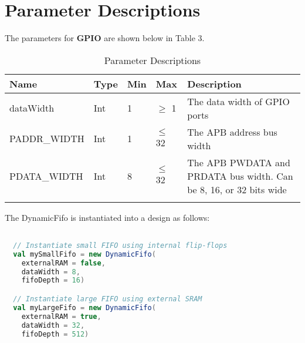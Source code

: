 
\section{Parameter Descriptions}

The parameters for \textbf{GPIO} are shown below in
Table 3.

\renewcommand*{\arraystretch}{1.4}
\begin{longtable}[H]{
    | p{}
    | p{}
    | p{}
    | p{}
    | p{} |
  }
  \hline
  \textbf{Name} &
  \textbf{Type} &
  \textbf{Min}  &
  \textbf{Max}  &
  \textbf{Description}            \\ \hline \hline

  dataWidth   &
  Int       &
  1         &
  $\geq$ 1          &
  The data width of GPIO ports \\ \hline

  PADDR\_WIDTH     &
  Int           &
  1             &
  $\leq$ 32       &
  The APB address bus width  \\ \hline

  PDATA\_WIDTH     &
  Int           &
  8             &
  $\leq$ 32       &
  The APB PWDATA and PRDATA bus width. Can be 8, 16, or 32 bits wide        \\ \hline

  \caption{Parameter Descriptions}\label{table:params}
\end{longtable}

The DynamicFifo is instantiated into a design as follows:

\begin{lstlisting}[language=Scala]

  // Instantiate small FIFO using internal flip-flops
  val mySmallFifo = new DynamicFifo(
    externalRAM = false, 
    dataWidth = 8, 
    fifoDepth = 16) 

  // Instantiate large FIFO using external SRAM
  val myLargeFifo = new DynamicFifo(
    externalRAM = true, 
    dataWidth = 32, 
    fifoDepth = 512) 

  \end{lstlisting}